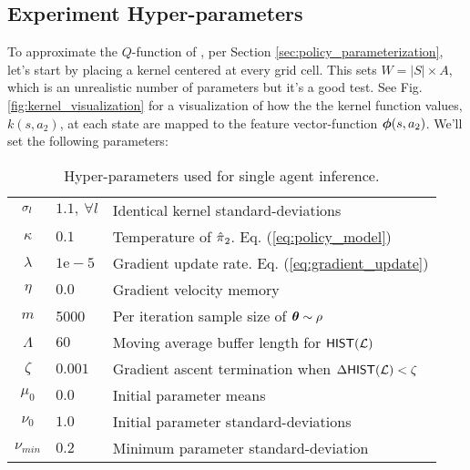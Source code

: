     \begin{figure}[htb]
        \begin{center}

        \end{center}
    \end{figure}

    \subsection{Experiment Hyper-parameters}
    To approximate the $Q$-function of , per Section \ref{sec:policy_parameterization}, let's start by placing
    a kernel centered at every grid cell. This sets $W=|S|\times A$, which is an unrealistic number of parameters but
    it's a good test. See Fig.  \ref{fig:kernel_visualization} for a visualization of how the the kernel function
    values, $k(s,a_2)$, at each state are mapped to the feature vector-function $\boldsymbol{\mathbb{\phi}}(s, a_2)$. We'll set the following
    parameters:

    \begin{table}[H]
        \centering
        \begin{tabular}{c|l l}
                $\sigma_{l}$ & $1.1,\ \forall l$ & Identical kernel standard-deviations\\
                $\kappa$ & $0.1$ & Temperature of $\hat{\pi_{}}_2$. Eq. (\ref{eq:policy_model}) \\
                $\lambda$ & $1\mathrm{e}\!-\!5$ & Gradient update rate. Eq. (\ref{eq:gradient_update}) \\
                $\eta$ & $0.0$ & Gradient velocity memory\\
                $m$ & 5000 & Per iteration sample size of $\boldsymbol{\mathbb{\theta}}\sim \rho$\\
                $\Lambda$ & $60$ & Moving average buffer length for $\mathsf{HIST}(\mathcal{L})$ \\
                $\zeta$ & $0.001$ & Gradient ascent termination when $\Delta\mathsf{HIST}(\mathcal{L}) < \zeta$\\
                    $\mu_{0}$ & $0.0$ & Initial parameter means\\
                $\nu_{0}$ & $1.0$ & Initial parameter standard-deviations\\
                $\nu_{min}$ & $0.2$ & Minimum parameter standard-deviation\\
        \end{tabular}
        \caption{Hyper-parameters used for single agent inference.}
        \label{table:single_agent_hyper_params}
    \end{table}

